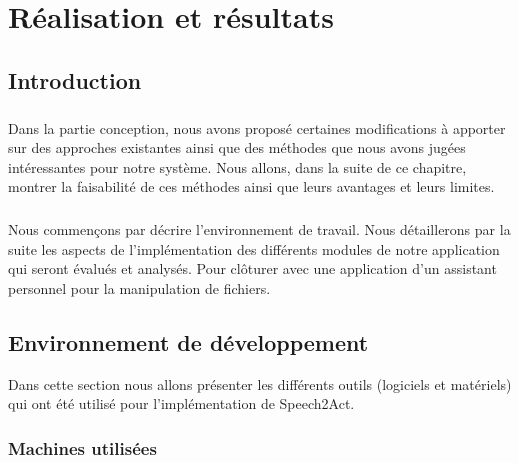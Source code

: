 \chapter{Réalisation et résultats}
\section{Introduction}
\paragraph{}Dans la partie conception, nous avons proposé certaines modifications à apporter sur des approches existantes ainsi que des méthodes que nous avons jugées intéressantes pour notre système. Nous allons, dans la suite de ce chapitre, montrer la faisabilité de ces méthodes ainsi que leurs avantages et leurs limites.
\paragraph{}Nous commençons par décrire l'environnement de travail. Nous détaillerons par la suite les aspects de l'implémentation des différents modules de notre application qui seront évalués et analysés. Pour clôturer avec une application d'un assistant personnel pour la manipulation de fichiers. 

\section{Environnement de développement}
Dans cette section nous allons présenter les différents outils (logiciels et matériels) qui ont été utilisé pour l'implémentation de Speech2Act.
	\subsection{Machines utilisées}
